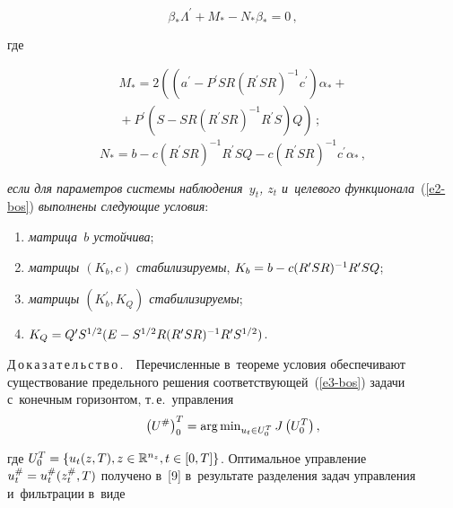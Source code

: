 \begin{multicols}{2}
\noindent
\begin{equation}
\beta_*\Lambda^\prime +M_* -N_*\beta_*=0\,,
\label{e7-bos}
\end{equation}

\vspace*{-3pt}

\noindent
где

\vspace*{-6pt}

\noindent
\begin{multline*}
M_*= 2\left( \left(a^\prime -P^\prime SR\left( R^\prime SR\right)^{-1} 
c^\prime\right) \alpha_* +{}\right.\\
\left.{}+P^\prime\left( S-SR\left( R^\prime SR\right)^{-1} R^\prime S\right) Q\right)\,;
\end{multline*}
$$
N_*= b-c\left( R^\prime SR\right)^{-1} R^\prime SQ -c\left( R^\prime SR\right)^{-
1} c^\prime \alpha_*\,,
$$

\vspace*{-4pt}

\noindent
\textit{если для параметров системы наблюдения~$y_t$, $z_t$ и~целевого 
функционала}~(\ref{e2-bos}) \textit{выполнены следующие условия}:
\begin{enumerate}[(1)]
\item  \textit{матрица~$b$ устойчива};
\item  \textit{матрицы $(K_b, c)$ стабилизируемы}, $K_b\hm= b\hm- 
c(R^\prime SR)^{-1} R^\prime SQ$;
\item  \textit{матрицы $(K_b^\prime, K_Q)$ стабилизируемы}; 
\item  $K_Q\hm= Q^\prime S^{1/2} (E\hm- S^{1/2} R (R^\prime SR)^{-1} 
R^\prime S^{1/2})$.
\end{enumerate}
     
     \noindent
     Д\,о\,к\,а\,з\,а\,т\,е\,л\,ь\,с\,т\,в\,о\,.\ \  Перечисленные в~теореме 
условия обеспечивают существование предельного решения 
соответствующей~(\ref{e3-bos}) задачи с~конечным горизонтом, т.\,е.\ 
управления 
$$
\left(U^\#\right)_0^T =\mathop{\mathrm{arg}\,\mathrm{min}}\nolimits_{u_t\in U_0^T} J\left(U_0^T\right),
$$

\vspace*{-4pt}

\noindent
 где 
$U_0^T\hm= \{u_t(z,T), z\hm\in \mathbb{R}^{n_z}, t\hm\in [0,T]\}$. 
Оптимальное управ\-ле\-ние $u_t^\# \hm= u_t^\#(z_t^\#, T)$ получено в~[9] 
в~результате разделения задач управ\-ле\-ния и~фильт\-ра\-ции в~виде

\vspace*{-2pt}


\end{multicols}
